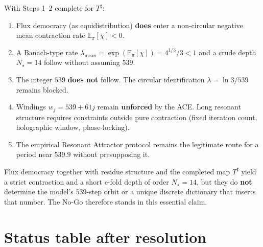 \begin{corollary}
\label{cor:lift}
With Steps 1--2 complete for \(T^\sharp\):
\begin{enumerate}[label=(\roman*)]
  \item Flux democracy (as equidistribution) \textbf{does} enter a non-circular
        negative mean contraction rate \(\mathbb{E}_\pi[\chi]<0\).
  \item A Banach-type rate
        \(\lambda_{\mathrm{mean}}=\exp(\mathbb{E}_\pi[\chi])=4^{1/3}/3<1\)
        and a crude depth \(N_\star=14\) follow without assuming \(539\).
  \item The integer \(539\) \textbf{does not} follow. The circular identification
        \(\lambda=\ln 3/539\) remains blocked.
  \item Windings \(w_j=539+61j\) remain \textbf{unforced} by the ACE. Long
        resonant structure requires constraints outside pure contraction
        (fixed iteration count, holographic window, phase-locking).
  \item The empirical Resonant Attractor protocol remains the legitimate route
        for a period near \(539.9\) without presupposing it.
\end{enumerate}
\end{corollary}

\begin{theorem}
\label{thm:essential-nogo}
Flux democracy together with residue structure and the completed map
\(T^\sharp\) yield a strict contraction and a short e-fold depth of order
\(N_\star=14\), but they do \textbf{not} determine the model's \(539\)-step
orbit or a unique discrete dictionary that inserts that number. The No-Go
therefore stands in this essential claim.
\end{theorem}

\section{Status table after resolution}
\label{sec:status-resolve}

